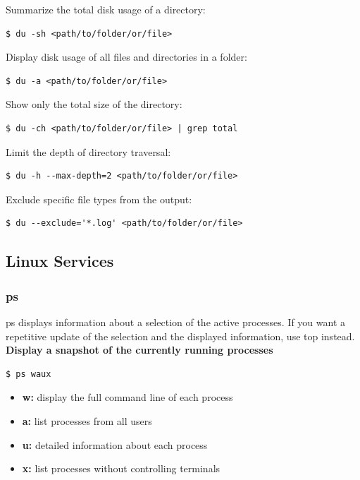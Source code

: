 \documentclass{article}
\newenvironment{codetemplate}[1][]{%
  \mybasecolorbox[#1]
  \itshape
}{%
  \endmybasecolorbox
}
\begin{document}
Summarize the total disk usage of a directory:
\begin{codetemplate}{}
\begin{verbatim}
$ du -sh <path/to/folder/or/file>
\end{verbatim}
\end{codetemplate}

Display disk usage of all files and directories in a folder:
\begin{codetemplate}{}
\begin{verbatim}
$ du -a <path/to/folder/or/file>
\end{verbatim}
\end{codetemplate}

Show only the total size of the directory:
\begin{codetemplate}{}
\begin{verbatim}
$ du -ch <path/to/folder/or/file> | grep total
\end{verbatim}
\end{codetemplate}

Limit the depth of directory traversal:
\begin{codetemplate}{}
\begin{verbatim}
$ du -h --max-depth=2 <path/to/folder/or/file>
\end{verbatim}
\end{codetemplate}

Exclude specific file types from the output:
\begin{codetemplate}{}
\begin{verbatim}
$ du --exclude='*.log' <path/to/folder/or/file>
\end{verbatim}
\end{codetemplate}

\subsection{Linux Services}
\subsubsection{ps}
ps displays information about a selection of the active processes.  If you want a repetitive update of the selection and the displayed information, use top instead.
\textbf{Display a snapshot of the currently running processes}
\begin{codetemplate}{}
\begin{verbatim}
$ ps waux
\end{verbatim}
\end{codetemplate}
\begin{itemize}
    \item \textbf{w:} display the full command line of each process
    \item \textbf{a:} list processes from all users
    \item \textbf{u:} detailed information about each process
    \item \textbf{x:} list processes without controlling terminals
\end{itemize}
\end{document}
